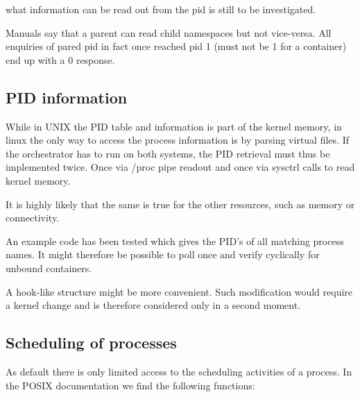 \documentclass[]{scrartcl}
\begin{document}
what information can be read out from the pid is still to be investigated.

Manuals say that a parent can read child namespaces but not vice-versa. All enquiries of pared pid in fact once reached pid 1 (must not be 1 for a container) end up with a 0 response.

\subsection{PID information}
\label{sub:pidinf}

While in UNIX the PID table and information is part of the kernel memory, in linux the only way to access the process information is by parsing virtual files. 
If the orchestrator has to run on both systems, the PID retrieval must thus be implemented twice. Once via /proc pipe readout and once via sysctrl calls to read kernel memory.

It is highly likely that the same is true for the other resources, such as memory or connectivity. 

An example code has been tested which gives the PID's of all matching process names. 
It might therefore be possible to poll once and verify cyclically for unbound containers. 

A hook-like structure might be more convenient. Such modification would require a kernel change and is therefore considered only in a second moment.

\subsection{Scheduling of processes}

As default there is only limited access to the scheduling activities of a process.
In the POSIX documentation we find the following functions:
\end{document}
